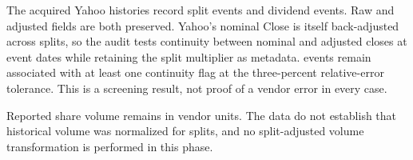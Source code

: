 
The acquired Yahoo histories record \SplitEvents{} split events and \DividendEvents{} dividend events. Raw and adjusted fields are both preserved. Yahoo's nominal Close is itself back-adjusted across splits, so the audit tests continuity between nominal and adjusted closes at event dates while retaining the split multiplier as metadata. \SplitFlags{} events remain associated with at least one continuity flag at the three-percent relative-error tolerance. This is a screening result, not proof of a vendor error in every case.

Reported share volume remains in vendor units. The data do not establish that historical volume was normalized for splits, and no split-adjusted volume transformation is performed in this phase.

